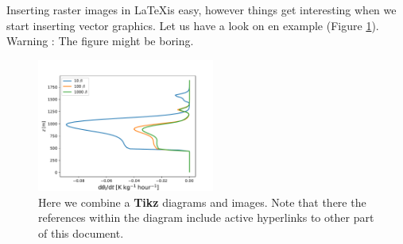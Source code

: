 \documentclass[a4paper,10pt]{report} %
\begin{document}
 Inserting raster images in \LaTeX is easy, however things get interesting when we start inserting vector graphics. Let us have a look on en example (Figure \ref{fig:figures}). Warning :  The figure might be boring.\\
 \begin{figure}[!ht] 
     \includegraphics[width=0.52\textwidth]{./figures/prof_tend.pdf}
        \caption[Diagrams and plots]{Here we combine a \textbf{Tikz} diagrams and images. Note that there the references within the diagram include active hyperlinks to other part of this document.}    
      \label{fig:figures}    
 \end{figure}
 
\end{document}
